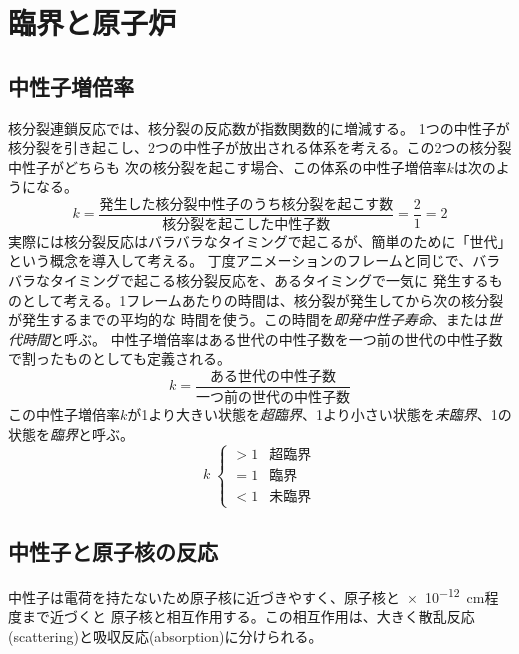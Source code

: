 \section{臨界と原子炉}

\subsection{中性子増倍率}
\label{subsec:multipilication_factor}
核分裂連鎖反応では、核分裂の反応数が指数関数的に増減する。
1つの中性子が核分裂を引き起こし、2つの中性子が放出される体系を考える。この2つの核分裂中性子がどちらも
次の核分裂を起こす場合、この体系の中性子増倍率$k$は次のようになる。
\begin{equation}
  k = \frac{\text{発生した核分裂中性子のうち核分裂を起こす数}}{\text{核分裂を起こした中性子数}} = \frac{2}{1} = 2
\end{equation}
実際には核分裂反応はバラバラなタイミングで起こるが、簡単のために「世代」という概念を導入して考える。
丁度アニメーションのフレームと同じで、バラバラなタイミングで起こる核分裂反応を、あるタイミングで一気に
発生するものとして考える。1フレームあたりの時間は、核分裂が発生してから次の核分裂が発生するまでの平均的な
時間を使う。この時間を\emph{即発中性子寿命}、または\emph{世代時間}と呼ぶ。
中性子増倍率はある世代の中性子数を一つ前の世代の中性子数で割ったものとしても定義される。
\begin{equation}
  \label{eq:multi_factor}
  k = \frac{\text{ある世代の中性子数}}{\text{一つ前の世代の中性子数}}
\end{equation}
この中性子増倍率$k$が1より大きい状態を\emph{超臨界}、1より小さい状態を\emph{未臨界}、1の状態を\emph{臨界}と呼ぶ。
\[
k \; \left\{
  \begin{array}{ll}
    > 1 & \text{超臨界} \\
    = 1 & \text{臨界} \\
    < 1 & \text{未臨界}
  \end{array}
\right.
\]

\subsection{中性子と原子核の反応}
中性子は電荷を持たないため原子核に近づきやすく、原子核と\SI{e-12}{\centi\metre}程度まで近づくと
原子核と相互作用する。この相互作用は、大きく散乱反応(scattering)と吸収反応(absorption)に分けられる。

